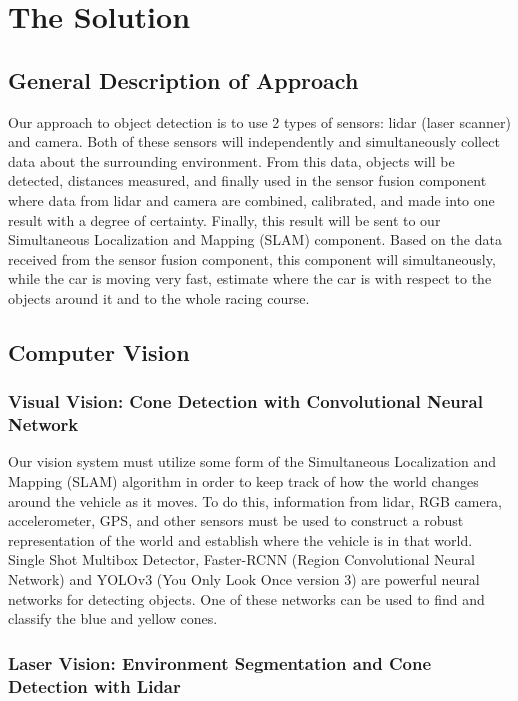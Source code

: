 \documentclass[10pt, onecolumn, draftclsnofoot, letterpaper,compsoc]{IEEEtran}
\begin{document}

\section{The Solution}
\subsection{General Description of Approach}

Our approach to object detection is to use 2 types of sensors: lidar (laser scanner) and camera. Both of these sensors will independently and simultaneously collect data about the surrounding environment. From this data, objects will be detected, distances measured, and finally used in the sensor fusion component where data from lidar and camera are combined, calibrated, and made into one result with a degree of certainty. Finally, this result will be sent to our Simultaneous Localization and Mapping (SLAM) component. Based on the data received from the sensor fusion component, this component will simultaneously, while the car is moving very fast, estimate where the car is with respect to the objects around it and to the whole racing course.

\subsection{Computer Vision}

\subsubsection{Visual Vision: Cone Detection with Convolutional Neural Network}
Our vision system must utilize some form of the Simultaneous Localization and Mapping (SLAM) algorithm in order to keep track of how the world changes around the vehicle as it moves. To do this, information from lidar, RGB camera, accelerometer, GPS, and other sensors must be used to construct a robust representation of the world and establish where the vehicle is in that world. Single Shot Multibox Detector, Faster-RCNN (Region Convolutional Neural Network) and YOLOv3 (You Only Look Once version 3) are powerful neural networks for detecting objects. One of these networks can be used to find and classify the blue and yellow cones. 

\subsubsection{Laser Vision: Environment Segmentation and Cone Detection with Lidar}
\end{document}

